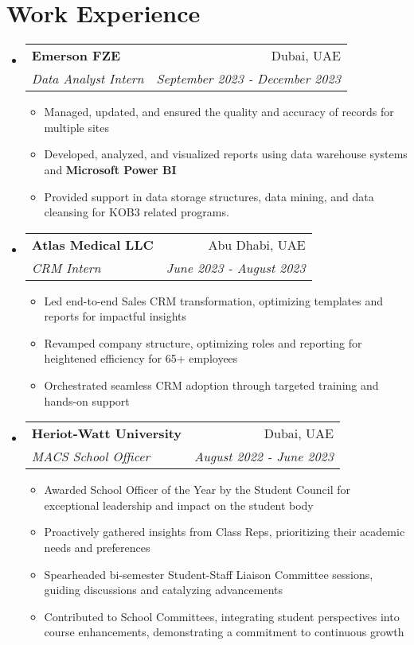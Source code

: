 \documentclass[a4paper,20pt]{article}
\makeatletter
\newcommand{\resumeItemWithoutTitle}[1] {
	\item\small{
		{#1 \vspace{-2pt}}
	}
}
\newcommand{\resumeSubheading}[4] {
	\vspace{-1pt}\item
	\begin{tabular*}{0.97\textwidth}{l@{\extracolsep{\fill}}r}
		\textbf{#1} & #2 \\
		\textit{#3} & \textit{#4} \\
	\end{tabular*}\vspace{-5pt}
}
\newcommand{\resumeSubHeadingListStart}{\begin{itemize}[leftmargin=*]}
\newcommand{\resumeSubHeadingListEnd}{\end{itemize}}
\newcommand{\resumeItemListStart}{\begin{itemize}}
\newcommand{\resumeItemListEnd}{\end{itemize}\vspace{-5pt}}
\makeatother
\begin{document}

\vspace{2pt}
\section{Work Experience}
	\resumeSubHeadingListStart
		\resumeSubheading{Emerson FZE}{Dubai, UAE} {Data Analyst Intern}{September 2023 - December 2023}
		\resumeItemListStart
			\resumeItemWithoutTitle{Managed, updated, and ensured the quality and accuracy of records for multiple sites}
			\resumeItemWithoutTitle{Developed, analyzed, and visualized reports using data warehouse systems and \textbf{Microsoft Power BI}}
			\resumeItemWithoutTitle{Provided support in data storage structures, data mining, and data cleansing for KOB3 related programs.}
		\resumeItemListEnd
		\vspace{5pt}
		\resumeSubheading{Atlas Medical LLC}{Abu Dhabi, UAE} {CRM Intern}{June 2023 - August 2023}
		\resumeItemListStart
			\resumeItemWithoutTitle{Led end-to-end Sales CRM transformation, optimizing templates and reports for impactful insights}
			\resumeItemWithoutTitle{Revamped company structure, optimizing roles and reporting for heightened efficiency for 65+ employees}
			\resumeItemWithoutTitle{Orchestrated seamless CRM adoption through targeted training and hands-on support}
		\resumeItemListEnd
		\resumeSubheading{Heriot-Watt University}{Dubai, UAE}{MACS School Officer}{August 2022 - June 2023}
		\resumeItemListStart
			\resumeItemWithoutTitle{Awarded School Officer of the Year by the Student Council for exceptional leadership and impact on the student body}
			\resumeItemWithoutTitle{Proactively gathered insights from Class Reps, prioritizing their academic needs and preferences}
			\resumeItemWithoutTitle{Spearheaded bi-semester Student-Staff Liaison Committee sessions, guiding discussions and catalyzing advancements}
			\resumeItemWithoutTitle{Contributed to School Committees, integrating student perspectives into course enhancements, demonstrating a commitment to continuous growth}
		\resumeItemListEnd
	\resumeSubHeadingListEnd
\vspace{-2pt}
\end{document}
